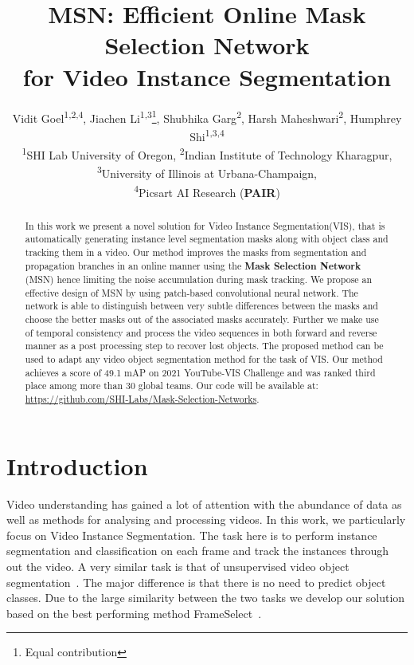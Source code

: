 \documentclass[final]{cvpr}
\begin{document}
\title{MSN: Efficient Online Mask Selection Network \\for Video Instance Segmentation
}



\author{Vidit Goel\textsuperscript{1,2,4}, Jiachen Li\textsuperscript{1,3}\thanks{Equal contribution}, Shubhika Garg\textsuperscript{2}\footnotemark[1]  , Harsh Maheshwari\textsuperscript{2}, Humphrey Shi\textsuperscript{1,3,4} \\
\small \textsuperscript{1}SHI Lab  University of Oregon,
\textsuperscript{2}Indian Institute of Technology Kharagpur,
\textsuperscript{3}University of Illinois at Urbana-Champaign,\\ \small \textsuperscript{4}Picsart AI Research (\textbf{PAIR})\\
}

\maketitle





\begin{abstract}
  In this work we present a novel solution for Video Instance Segmentation(VIS), that is automatically generating instance level segmentation masks along with object class and tracking them in a video. 
Our method improves the masks from segmentation and propagation branches in an online manner using the \textbf{Mask Selection Network} (MSN) hence limiting the noise accumulation during mask tracking. We propose an effective design of MSN by using patch-based convolutional neural network. The network is able to distinguish between very subtle differences between the masks and choose the better masks out of the associated masks accurately. Further we make use of temporal consistency and process the video sequences in both forward and reverse manner as a post processing step to recover lost objects. The proposed method can be used to adapt any video object segmentation method for the task of VIS. Our method achieves a score of 49.1 mAP on 2021 YouTube-VIS Challenge and was ranked third place among more than 30 global teams.
  Our code will be available at:  \href{https://github.com/SHI-Labs/Mask-Selection-Networks}{https://github.com/SHI-Labs/Mask-Selection-Networks}.
\end{abstract}

\section{Introduction}
Video understanding has gained a lot of attention with the abundance of data as well as methods for analysing and processing videos. In this work, we particularly focus on Video Instance Segmentation. The task here is to perform instance segmentation and classification on each frame and track the instances through out the video. A very similar task is that of unsupervised video object segmentation~\cite{Caelles_arXiv_2019}. The major difference is that there is no need to predict object classes. 
Due to the large similarity between the two tasks we develop our solution based on the best performing method FrameSelect~\cite{garg2021mask}. 
\end{document}
